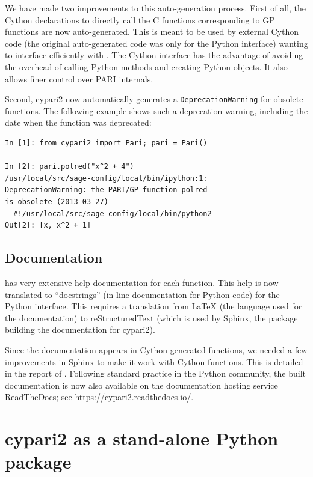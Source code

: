 \documentclass{deliverablereport}
\begin{document}
We have made two improvements to this auto-generation process.
First of all,
the Cython declarations to directly call the C functions
corresponding to GP functions are now auto-generated.
This is meant to be used by external Cython code
(the original auto-generated code was only for the Python interface)
wanting to interface efficiently with \Pari.
The Cython interface has the advantage of avoiding the
overhead of calling Python methods and creating Python objects.
It also allows finer control over PARI internals.


Second, cypari2 now automatically
generates a \texttt{DeprecationWarning}
for obsolete \PariGP functions.
The following example shows such a deprecation warning,
including the date when the function was deprecated:
\begin{verbatim}
In [1]: from cypari2 import Pari; pari = Pari()

In [2]: pari.polred("x^2 + 4")
/usr/local/src/sage-config/local/bin/ipython:1:
DeprecationWarning: the PARI/GP function polred
is obsolete (2013-03-27)
  #!/usr/local/src/sage-config/local/bin/python2
Out[2]: [x, x^2 + 1]
\end{verbatim}

\subsection{Documentation}

\PariGP has very extensive help documentation for each function.  This help is
now translated to ``docstrings'' (in-line documentation for Python code) for
the Python interface.
This requires a translation from \LaTeX{}
(the language used for the \PariGP documentation)
to reStructuredText (which is used by Sphinx,
the package building the documentation for cypari2).

Since the documentation appears in Cython-generated functions,
we needed a few improvements in Sphinx to make it work
with Cython functions.
This is detailed in the report of .
Following standard practice in the Python community,
the built documentation is now also available on the
documentation hosting service ReadTheDocs;
see \url{https://cypari2.readthedocs.io/}.

\section{cypari2 as a stand-alone Python package}
\end{document}
